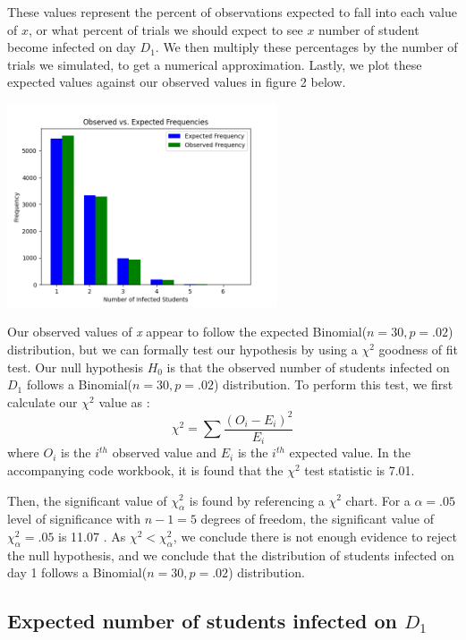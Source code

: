 \documentclass[
	letterpaper, %
]{jdf}
\begin{document}
These values represent the percent of observations expected to fall into each value of \(x\), or what percent of trials we should expect to see \(x\) number of student become infected on day \(D_1\). We then multiply these percentages by the number of trials we simulated, to get a numerical approximation. Lastly, we plot these expected values against our observed values in figure 2 below.

\begin{jdffigure}
\includegraphics[height=6cm]{Figures/q2_hist_obs_vs_exp.png}%
\end{jdffigure}

Our observed values of \textit{x} appear to follow the expected Binomial(\(n = 30, p = .02\)) distribution, but we can formally test our hypothesis by using a \(\chi^2\) goodness of fit test. Our null hypothesis \(H_0\) is that the observed number of students infected on \(D_1\) follows a Binomial(\(n = 30, p = .02\)) distribution. To perform this test, we first calculate our \(\chi^2\) value as \citep{goldsman2020}:
\[\chi^2=\sum \frac{\left(O_i-E_i\right)^2}{E_i}\]
where \(O_i\) is the \(i^{th}\) observed value and \(E_i\) is the \(i^{th}\) expected value. In the accompanying code workbook, it is found that the \(\chi^2\) test statistic is 7.01.


Then, the significant value of \(\chi_\alpha^2\) is found by referencing a \(\chi^2\) chart. For a \(\alpha = .05\) level of significance with \(n-1 =5\) degrees of freedom, the significant value of \(\chi_\alpha^2= .05\) is 11.07 \citep{goldsman2020}. As \(\chi^2 < \chi_\alpha^2\), we conclude there is not enough evidence to reject the null hypothesis, and we conclude that the distribution of students infected on day 1 follows a Binomial(\(n = 30, p = .02\)) distribution. 

\subsection{Expected number of students infected on \(D_1\)}
\end{document}
